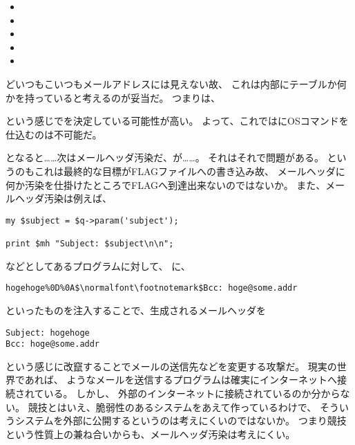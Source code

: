 \begin{itemize}
	\item {}
	\item {}
	\item {}
	\item {}
	\item {}
\end{itemize}

どいつもこいつもメールアドレスには見えない故、
これは内部にテーブルか何かを持っていると考えるのが妥当だ。
つまりは、



という感じでを決定している可能性が高い。
よって、これではにOSコマンドを仕込むのは不可能だ。

となると……次はメールヘッダ汚染だ、が……。
それはそれで問題がある。
というのもこれは最終的な目標がFLAGファイルへの書き込み故、
メールヘッダに何か汚染を仕掛けたところでFLAGへ到達出来ないのではないか。
また、メールヘッダ汚染は例えば、

\begin{lstlisting}[style=perl]
my $subject = $q->param('subject');

print $mh "Subject: $subject\n\n";
\end{lstlisting}

などとしてあるプログラムに対して、
に、

\begin{lstlisting}[mathescape]
hogehoge%0D%0A$\normalfont\footnotemark$Bcc: hoge@some.addr
\end{lstlisting}

といったものを注入することで、生成されるメールヘッダを

\begin{lstlisting}
Subject: hogehoge
Bcc: hoge@some.addr
\end{lstlisting}

という感じに改竄することでメールの送信先などを変更する攻撃だ。
現実の世界であれば、
ようなメールを送信するプログラムは確実にインターネットへ接続されている。
しかし、
外部のインターネットに接続されているのか分からない。
競技とはいえ、脆弱性のあるシステムをあえて作っているわけで、
そういうシステムを外部に公開するというのは考えにくいのではないか。
つまり競技という性質上の兼ね合いからも、メールヘッダ汚染は考えにくい。


